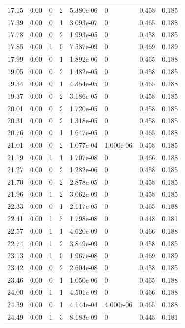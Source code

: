 \documentclass[preview]{standalone}
\begin{document}
{{{\begin{tabular}{L{1.2cm}C{1.2cm} C{0.3cm}C{0.5cm} C{1.4cm}C{1.4cm} C{1.4cm}C{1.4cm}}
  17.15  &  0.00  & 0     &  2 &  5.380e-06  & 0  & 0.458 &  0.185   \\ 
  17.39  &  0.00  & 0     &  1 &  3.093e-07  & 0  & 0.465 &  0.188   \\ 
  17.78  &  0.00  & 0     &  2 &  1.993e-05  & 0  & 0.458 &  0.185   \\ 
  17.85  &  0.00  & 1     &  0 &  7.537e-09  & 0  & 0.469 &  0.189   \\ 
  17.99  &  0.00  & 0     &  1 &  1.892e-06  & 0  & 0.465 &  0.188   \\ 
  19.05  &  0.00  & 0     &  2 &  1.482e-05  & 0  & 0.458 &  0.185   \\ 
  19.34  &  0.00  & 0     &  1 &  4.354e-05  & 0  & 0.465 &  0.188   \\ 
  19.37  &  0.00  & 0     &  2 &  3.186e-05  & 0  & 0.458 &  0.185   \\ 
  20.01  &  0.00  & 0     &  2 &  1.720e-05  & 0  & 0.458 &  0.185   \\ 
  20.31  &  0.00  & 0     &  2 &  1.318e-05  & 0  & 0.458 &  0.185   \\ 
  20.76  &  0.00  & 0     &  1 &  1.647e-05  & 0  & 0.465 &  0.188   \\ 
  21.01  &  0.00  & 0     &  2 &  1.077e-04  & 1.000e-06  & 0.458 &  0.185   \\ 
  21.19  &  0.00  & 1     &  1 &  1.707e-08  & 0  & 0.466 &  0.188   \\ 
  21.27  &  0.00  & 0     &  2 &  1.282e-06  & 0  & 0.458 &  0.185   \\ 
  21.70  &  0.00  & 0     &  2 &  2.878e-05  & 0  & 0.458 &  0.185   \\ 
  21.96  &  0.00  & 1     &  2 &  3.062e-09  & 0  & 0.458 &  0.185   \\ 
  22.33  &  0.00  & 0     &  1 &  2.117e-05  & 0  & 0.465 &  0.188   \\ 
  22.41  &  0.00  & 1     &  3 &  1.798e-08  & 0  & 0.448 &  0.181   \\ 
  22.57  &  0.00  & 1     &  1 &  4.620e-09  & 0  & 0.466 &  0.188   \\ 
  22.74  &  0.00  & 1     &  2 &  3.849e-09  & 0  & 0.458 &  0.185   \\ 
  23.13  &  0.00  & 1     &  0 &  1.967e-08  & 0  & 0.469 &  0.189   \\ 
  23.42  &  0.00  & 0     &  2 &  2.604e-08  & 0  & 0.458 &  0.185   \\ 
  23.46  &  0.00  & 0     &  1 &  1.050e-06  & 0  & 0.465 &  0.188   \\ 
  24.00  &  0.00  & 1     &  1 &  4.501e-09  & 0  & 0.466 &  0.188   \\ 
  24.39  &  0.00  & 0     &  1 &  4.144e-04  & 4.000e-06  & 0.465 &  0.188   \\ 
  24.49  &  0.00  & 1     &  3 &  8.183e-09  & 0  & 0.448 &  0.181   \\ 
\hline 
\end{tabular} 

}}}
\end{document}

